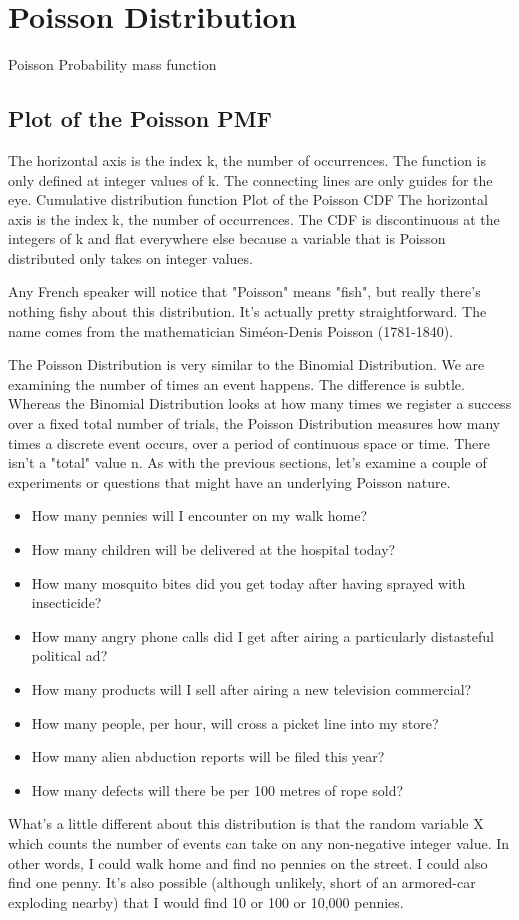 

\section{Poisson Distribution}
Poisson
Probability mass function
\subsection{Plot of the Poisson PMF}
The horizontal axis is the index k, the number of occurrences. The function is only defined at integer values of k. The connecting lines are only guides for the eye.
Cumulative distribution function
Plot of the Poisson CDF
The horizontal axis is the index k, the number of occurrences. The CDF is discontinuous at the integers of k and flat everywhere else because a variable that is Poisson distributed only takes on integer values.

Any French speaker will notice that "Poisson" means "fish", but really there's nothing fishy about this distribution. It's actually pretty straightforward. The name comes from the mathematician Siméon-Denis Poisson (1781-1840).

The Poisson Distribution is very similar to the Binomial Distribution. We are examining the number of times an event happens. The difference is subtle. Whereas the Binomial Distribution looks at how many times we register a success over a fixed total number of trials, the Poisson Distribution measures how many times a discrete event occurs, over a period of continuous space or time. There isn't a "total" value n. As with the previous sections, let's examine a couple of experiments or questions that might have an underlying Poisson nature.
\begin{itemize}
\item How many pennies will I encounter on my walk home?
\item How many children will be delivered at the hospital today?
\item How many mosquito bites did you get today after having sprayed with insecticide?
\item How many angry phone calls did I get after airing a particularly distasteful political ad?
\item How many products will I sell after airing a new television commercial?
\item How many people, per hour, will cross a picket line into my store?
\item How many alien abduction reports will be filed this year?
\item How many defects will there be per 100 metres of rope sold?
\end{itemize}
What's a little different about this distribution is that the random variable X which counts the number of events can take on any non-negative integer value. In other words, I could walk home and find no pennies on the street. I could also find one penny. It's also possible (although unlikely, short of an armored-car exploding nearby) that I would find 10 or 100 or 10,000 pennies.


